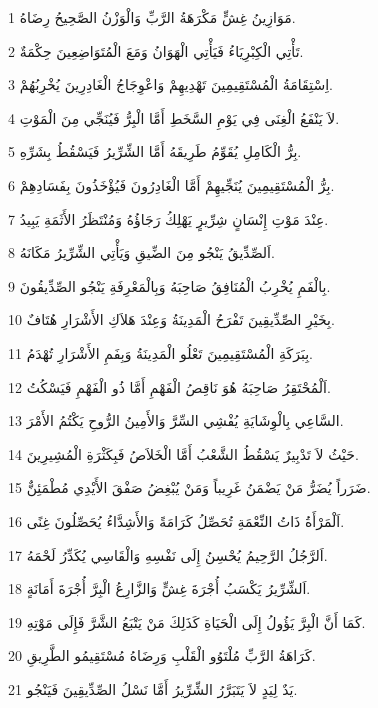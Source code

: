 \par 1 مَوَازِينُ غِشٍّ مَكْرَهَةُ الرَّبِّ وَالْوَزْنُ الصَّحِيحُ رِضَاهُ.
\par 2 تَأْتِي الْكِبْرِيَاءُ فَيَأْتِي الْهَوَانُ وَمَعَ الْمُتَوَاضِعِينَ حِكْمَةٌ.
\par 3 اِسْتِقَامَةُ الْمُسْتَقِيمِينَ تَهْدِيهِمْ وَاعْوِجَاجُ الْغَادِرِينَ يُخْرِبُهُمْ.
\par 4 لاَ يَنْفَعُ الْغِنَى فِي يَوْمِ السَّخَطِ أَمَّا الْبِرُّ فَيُنَجِّي مِنَ الْمَوْتِ.
\par 5 بِرُّ الْكَامِلِ يُقَوِّمُ طَرِيقَهُ أَمَّا الشِّرِّيرُ فَيَسْقُطُ بِشَرِّهِ.
\par 6 بِرُّ الْمُسْتَقِيمِينَ يُنَجِّيهِمْ أَمَّا الْغَادِرُونَ فَيُؤْخَذُونَ بِفَسَادِهِمْ.
\par 7 عِنْدَ مَوْتِ إِنْسَانٍ شِرِّيرٍ يَهْلِكُ رَجَاؤُهُ وَمُنْتَظَرُ الأَثَمَةِ يَبِيدُ.
\par 8 اَلصِّدِّيقُ يَنْجُو مِنَ الضِّيقِ وَيَأْتِي الشِّرِّيرُ مَكَانَهُ.
\par 9 بِالْفَمِ يُخْرِبُ الْمُنَافِقُ صَاحِبَهُ وَبِالْمَعْرِفَةِ يَنْجُو الصِّدِّيقُونَ.
\par 10 بِخَيْرِ الصِّدِّيقِينَ تَفْرَحُ الْمَدِينَةُ وَعِنْدَ هَلاَكِ الأَشْرَارِ هُتَافٌ.
\par 11 بِبَرَكَةِ الْمُسْتَقِيمِينَ تَعْلُو الْمَدِينَةُ وَبِفَمِ الأَشْرَارِ تُهْدَمُ.
\par 12 اَلْمُحْتَقِرُ صَاحِبَهُ هُوَ نَاقِصُ الْفَهْمِ أَمَّا ذُو الْفَهْمِ فَيَسْكُتُ.
\par 13 السَّاعِي بِالْوِشَايَةِ يُفْشِي السِّرَّ وَالأَمِينُ الرُّوحِ يَكْتُمُ الأَمْرَ.
\par 14 حَيْثُ لاَ تَدْبِيرٌ يَسْقُطُ الشَّعْبُ أَمَّا الْخَلاَصُ فَبِكَثْرَةِ الْمُشِيرِينَ.
\par 15 ضَرَراً يُضَرُّ مَنْ يَضْمَنُ غَرِيباً وَمَنْ يُبْغِضُ صَفْقَ الأَيْدِي مُطْمَئِنٌّ.
\par 16 اَلْمَرْأَةُ ذَاتُ النِّعْمَةِ تُحَصِّلُ كَرَامَةً وَالأَشِدَّاءُ يُحَصِّلُونَ غِنًى.
\par 17 اَلرَّجُلُ الرَّحِيمُ يُحْسِنُ إِلَى نَفْسِهِ وَالْقَاسِي يُكَدِّرُ لَحْمَهُ.
\par 18 اَلشِّرِّيرُ يَكْسَبُ أُجْرَةَ غِشٍّ وَالزَّارِعُ الْبِرَّ أُجْرَةَ أَمَانَةٍ.
\par 19 كَمَا أَنَّ الْبِرَّ يَؤُولُ إِلَى الْحَيَاةِ كَذَلِكَ مَنْ يَتْبَعُ الشَّرَّ فَإِلَى مَوْتِهِ.
\par 20 كَرَاهَةُ الرَّبِّ مُلْتَوُو الْقَلْبِ وَرِضَاهُ مُسْتَقِيمُو الطَّرِيقِ.
\par 21 يَدٌ لِيَدٍ لاَ يَتَبَرَّرُ الشِّرِّيرُ أَمَّا نَسْلُ الصِّدِّيقِينَ فَيَنْجُو.
